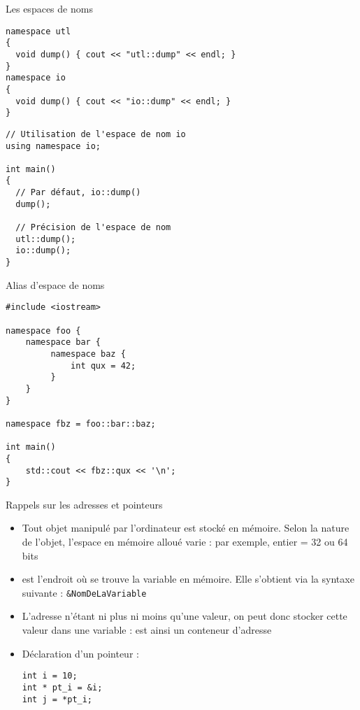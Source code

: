 \documentclass[c]{beamer}
\begin{document}
\begin{frame}[fragile]{Les espaces de noms}
 \begin{verbatim}
namespace utl
{
  void dump() { cout << "utl::dump" << endl; }
}
namespace io
{
  void dump() { cout << "io::dump" << endl; }
}
\end{verbatim}
\pause
\begin{verbatim}
// Utilisation de l'espace de nom io
using namespace io;

int main()
{
  // Par défaut, io::dump()
  dump();

  // Précision de l'espace de nom
  utl::dump();
  io::dump();
}
\end{verbatim}
\end{frame}

\begin{frame}[fragile]{Alias d'espace de noms}
\begin{verbatim}
#include <iostream>
 
namespace foo {
    namespace bar {
         namespace baz {
             int qux = 42;
         }
    }
}
 
namespace fbz = foo::bar::baz;
 
int main()
{
    std::cout << fbz::qux << '\n';
}
\end{verbatim}
\end{frame}




\begin{frame}[fragile]{Rappels sur les adresses et pointeurs}
 \begin{itemize}
\item Tout objet manipulé par l'ordinateur est stocké en mémoire. Selon la nature de
l'objet, l'espace en mémoire alloué varie : par exemple, entier = 32 ou 64 bits

\item {} est l'endroit où se trouve la variable en mémoire. Elle s'obtient
via la syntaxe suivante : \texttt{\&NomDeLaVariable}

\item L'adresse n'étant ni plus ni moins qu'une valeur, on peut donc stocker cette
valeur dans une variable :  est ainsi un conteneur d'adresse

\item Déclaration d'un pointeur :

\begin{verbatim}
int i = 10;
int * pt_i = &i;
int j = *pt_i;
\end{verbatim}
\end{itemize}
\end{frame}
\end{document}
